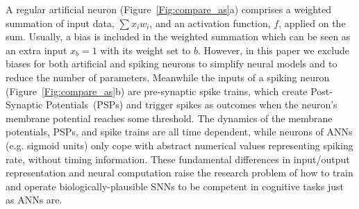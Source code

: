 \documentclass{article}
\begin{document}
A regular artificial neuron (Figure~\ref{Fig:compare_as}a) comprises a weighted summation of input data, $\sum x_i w_i$, and an activation function, $f$, applied on the sum.
Usually, a bias is included in the weighted summation which can be seen as an extra input $x_b = 1$ with its weight set to $b$.
However, in this paper we exclude biases for both artificial and spiking neurons to simplify neural models and to reduce the number of parameters.
Meanwhile the inputs of a spiking neuron (Figure~\ref{Fig:compare_as}b) are pre-synaptic spike trains, which create Post-Synaptic Potentials~(PSPs) and trigger spikes as outcomes when the neuron's membrane potential reaches some threshold.
The dynamics of the membrane potentials, PSPs, and spike trains are all time dependent, while neurons of ANNs (e.g. sigmoid units) only cope with abstract numerical values representing spiking rate, without timing information.
These fundamental differences in input/output representation and neural computation raise the research problem of how to train and operate biologically-plausible SNNs to be competent in cognitive tasks just as ANNs are.
\end{document}
